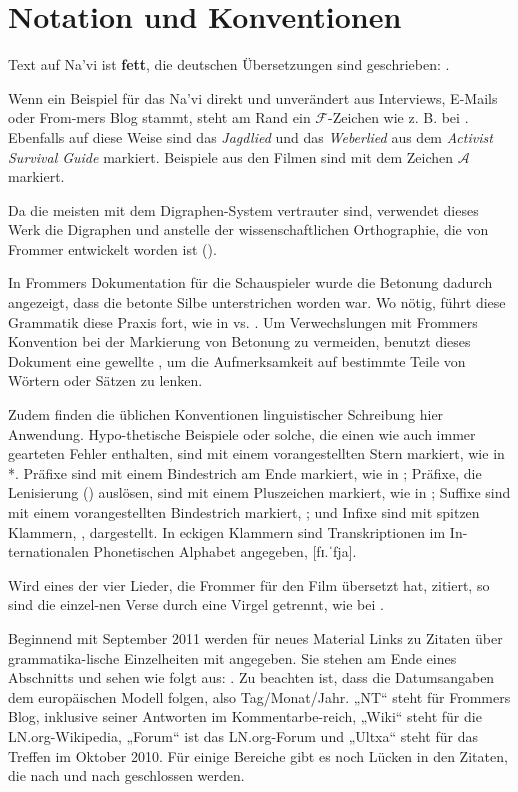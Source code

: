 \section{Notation und Konventionen}

\noindent Text auf Na'vi ist \textbf{fett}, die deutschen Übersetzungen sind  geschrieben:  .

Wenn ein Beispiel für das Na'vi direkt und unverändert aus Interviews, E-Mails oder From-mers Blog stammt, steht am Rand ein $\mathcal{F}$-Zeichen wie z. B. bei . Ebenfalls auf diese Weise sind das \textit{Jagdlied} und das \textit{Weberlied} aus dem \textit{Activist Survival Guide} markiert. Beispiele aus den Filmen sind mit dem Zeichen $\mathcal{A}$ markiert.

Da die meisten mit dem Digraphen-System vertrauter sind, verwendet dieses Werk die Digraphen  und  anstelle der wissenschaftlichen Orthographie, die von Frommer entwickelt worden ist ().

In Frommers Dokumentation für die Schauspieler wurde die Betonung dadurch angezeigt, dass die betonte Silbe unterstrichen worden war. Wo nötig, führt diese Grammatik diese Praxis fort, wie in   vs.  . Um Verwechslungen mit Frommers Konvention bei der Markierung von Betonung zu vermeiden, benutzt dieses Dokument eine gewellte , um die Aufmerksamkeit auf bestimmte Teile von Wörtern oder Sätzen zu lenken.

Zudem finden die üblichen Konventionen linguistischer Schreibung hier Anwendung. Hypo-thetische Beispiele oder solche, die einen wie auch immer gearteten Fehler enthalten, sind mit einem vorangestellten Stern markiert, wie in *. Präfixe sind mit einem Bindestrich am Ende markiert, wie in ; Präfixe, die Lenisierung () auslösen, sind mit einem Pluszeichen markiert, wie in ; Suffixe sind mit einem vorangestellten Bindestrich markiert, ; und Infixe sind mit spitzen Klammern, , dargestellt. In eckigen Klammern sind Transkriptionen im In-ternationalen Phonetischen Alphabet angegeben, [fɪ.ˈfja].

Wird eines der vier Lieder, die Frommer für den Film übersetzt hat, zitiert, so sind die einzel-nen Verse durch eine Virgel getrennt, wie bei .

Beginnend mit September 2011 werden für neues Material Links zu Zitaten über grammatika-lische Einzelheiten mit angegeben. Sie stehen am Ende eines Abschnitts und sehen wie folgt aus: . Zu beachten ist, dass die Datumsangaben dem europäischen Modell folgen, also Tag/Monat/Jahr. „NT“ steht für Frommers Blog, inklusive seiner Antworten im Kommentarbe-reich, „Wiki“ steht für die LN.org-Wikipedia, „Forum“ ist das LN.org-Forum und „Ultxa“ steht für das Treffen im Oktober 2010. Für einige Bereiche gibt es noch Lücken in den Zitaten, die nach und nach geschlossen werden.

